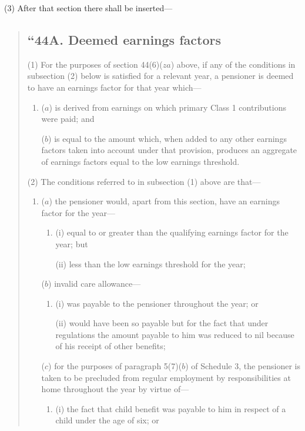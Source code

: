 \documentclass[12pt,a4paper]{article}
\begin{document}
(3) After that section there shall be inserted—
\begin{quotation}
\subsection*{“44A. Deemed earnings factors}

(1) For the purposes of section 44(6)($za$)  above, if any of the conditions in subsection (2)  below is satisfied for a relevant year, a pensioner is deemed to have an earnings factor for that year which—
\begin{enumerate}\item[]
($a$) is derived from earnings on which primary Class 1 contributions were paid; and

($b$) is equal to the amount which, when added to any other earnings factors taken into account under that provision, produces an aggregate of earnings factors equal to the low earnings threshold.
\end{enumerate}

(2) The conditions referred to in subsection (1)  above are that—
\begin{enumerate}\item[]
($a$) the pensioner would, apart from this section, have an earnings factor for the year—
\begin{enumerate}\item[]
(i) equal to or greater than the qualifying earnings factor for the year; but

(ii) less than the low earnings threshold for the year;
\end{enumerate}

($b$) invalid care allowance—
\begin{enumerate}\item[]
(i) was payable to the pensioner throughout the year; or

(ii) would have been so payable but for the fact that under regulations the amount payable to him was reduced to nil because of his receipt of other benefits;
\end{enumerate}

($c$) for the purposes of paragraph 5(7)($b$)  of Schedule 3, the pensioner is taken to be precluded from regular employment by responsibilities at home throughout the year by virtue of—
\begin{enumerate}\item[]
(i) the fact that child benefit was payable to him in respect of a child under the age of six; or


\end{enumerate}
\end{enumerate}
\end{quotation}
\end{document}
